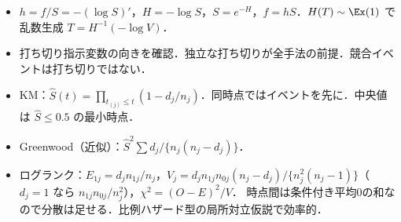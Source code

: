 \begin{summarybox}
\begin{itemize}
\item $h=f/S=-(\log S)'$，$H=-\log S$，$S=e^{-H}$，$f=hS$．$H(T)\sim\Ex(1)$ で乱数生成 $T=H^{-1}(-\log V)$．
\item 打ち切り指示変数の向きを確認．独立な打ち切りが全手法の前提．競合イベントは打ち切りではない．
\item KM：$\hat S(t)=\prod_{t_{(j)}\le t}(1-d_j/n_j)$．同時点ではイベントを先に．中央値は $\hat S\le0.5$ の最小時点．
\item Greenwood（近似）：$\hat S^2\sum d_j/\{n_j(n_j-d_j)\}$．
\item ログランク：$E_{1j}=d_jn_{1j}/n_j$，$V_j=d_jn_{1j}n_{0j}(n_j-d_j)/\{n_j^2(n_j-1)\}$（$d_j=1$ なら $n_{1j}n_{0j}/n_j^2$），$\chi^2=(O-E)^2/V$．
      時点間は条件付き平均0の和なので分散は足せる．比例ハザード型の局所対立仮説で効率的．
\end{itemize}
\end{summarybox}
